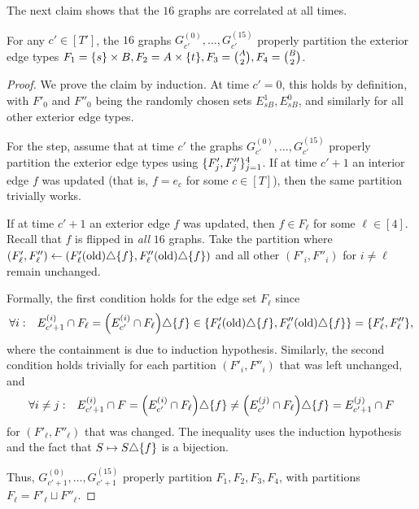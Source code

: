 \documentclass[letter,11pt]{article}
\begin{document}
The next claim shows that the $16$ graphs are correlated at all times.
\begin{claim}
    \label{lem:always_partitioned}
    For any $c'\in [T']$, the $16$ graphs $G^{(0)}_{c'}, \dots, G^{(15)}_{c'}$ properly partition the exterior edge types $F_1 = \{s\} \times B, F_2 = A \times \{t\}, F_3 = \binom{A}{2}, F_4 = \binom{B}{2}$.
\end{claim}

\begin{proof}
    We prove the claim by induction.
    At time $c'=0$, this holds by definition, with $F'_0$ and $F''_0$ being the randomly chosen sets $E_{sB}^1, E_{sB}^0$, and similarly for all other exterior edge types.
    
    For the step, assume that at time $c'$ the graphs $G^{(0)}_{c'}, \dots, G^{(15)}_{c'}$ properly partition the exterior edge types using $\{F'_j, F''_j\}_{j=1}^{4}$.
    If at time $c'+1$ an interior edge $f$ was updated (that is, $f=e_c$ for some $c\in[T]$), then the same partition trivially works.
    
    If at time $c'+1$ an exterior edge $f$ was updated, then $f\in F_{\ell}$ for some $\ell\in[4]$.
    Recall that $f$ is flipped in \emph{all} $16$ graphs. 
    Take the partition where
    $\left(F'_{\ell}, F''_{\ell}\right) \gets
    \left(F'_{\ell}\text{(old)} \symdif \set{f},F''_{\ell}\text{(old)} \symdif \set{f}\right)$ and all other $(F'_i,F''_i)$ for $i\neq {\ell}$ remain unchanged.
    
    Formally, the first condition holds for the edge set $F_{\ell}$ since
    \[
\begin{aligned}
        \forall i: &&
        E^{(i)}_{c'+1} \cap F_{\ell} 
        = \left( E^{(i)}_{c'} \cap F_{\ell} \right) \symdif \set{f} 
        \in \set{F'_{\ell}\text{(old)} \symdif \set{f},
        F''_{\ell}\text{(old)} \symdif \set{f}} 
        = \set{F'_{\ell}, F''_{\ell}} ,
    \end{aligned}
\]
    where the containment is due to induction hypothesis. 
    Similarly, the second condition holds trivially for each partition $(F'_i,F''_i)$ that was left unchanged, and 
    \[
\begin{aligned}
        \forall i\neq j: &&
        E^{(i)}_{c'+1} \cap F 
        = \left( E^{(i)}_{c'} \cap F_{\ell} \right) \symdif \set{f} 
        \neq \left( E^{(j)}_{c'} \cap F_{\ell} \right) \symdif \set{f} 
        = E^{(j)}_{c'+1} \cap F
    \end{aligned}
\]
    for $(F'_\ell,F''_\ell)$ that was changed.
    The inequality uses the induction hypothesis and the fact that $S \mapsto S\triangle\{f\}$ is a bijection.

    Thus, $G^{(0)}_{c'+1}, \dots, G^{(15)}_{c'+1}$ properly partition $F_1, F_2, F_3, F_4$, with partitions $F_{\ell} = F'_{\ell} \sqcup F''_{\ell}$.
\end{proof}
\end{document}
